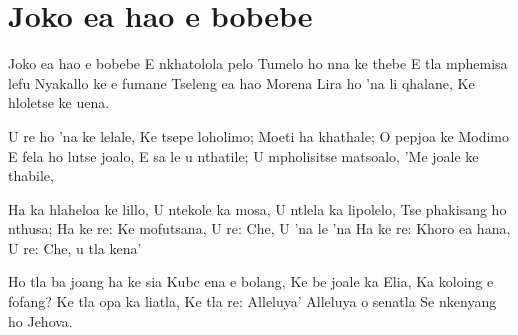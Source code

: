 \starttocol
\chapter{Joko ea hao e bobebe}
\nexttocol
\hfill{\it }
\stoptocol
\starttocol
\startlines
{\sc Joko} ea hao e bobebe 
E nkhatolola pelo
Tumelo ho nna ke thebe
E tla mphemisa lefu
Nyakallo ke e fumane
Tseleng ea hao Morena
Lira ho 'na li qhalane,
Ke hloletse ke uena.

U re ho 'na ke lelale,
Ke tsepe loholimo;
Moeti ha khathale;
O pepjoa ke Modimo
E fela ho lutse joalo,
E sa le u nthatile;
U mpholisitse matsoalo,
'Me joale ke thabile, 

Ha ka hlaheloa ke lillo,
U ntekole ka mosa,
U ntlela ka lipolelo,
Tse phakisang ho nthusa;
Ha ke re: Ke mofutsana,
U re: Che, U 'na le 'na
Ha ke re: Khoro ea hana,
U re: Che, u tla kena'

Ho tla ba joang ha ke sia
Kubc ena e bolang,
Ke be joale ka Elia, 
Ka koloing e fofang?
Ke tla opa ka liatla,
Ke tla re: Alleluya'
Alleluya o senatla
Se nkenyang ho Jehova.

\stoplines
\nexttocol

\stoptocol
